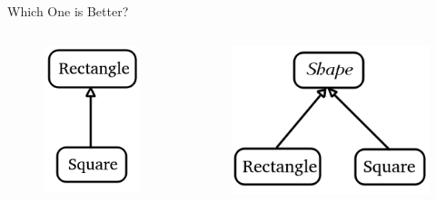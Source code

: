 \documentclass{beamer}
\begin{document}
\begin{frame}{Which One is Better?}
    \begin{columns}
        \begin{column}{0.5\linewidth}
            \begin{figure}[h]
                \centering
                \includegraphics[scale=0.6]{figures/shape_original.png}
            \end{figure}
        \end{column}
        \begin{column}{0.5\linewidth}
            \begin{figure}[h]
                \centering
                \includegraphics[scale=0.6]{figures/shape_new.png}
            \end{figure}
        \end{column}
    \end{columns}
\end{frame}
\end{document}

